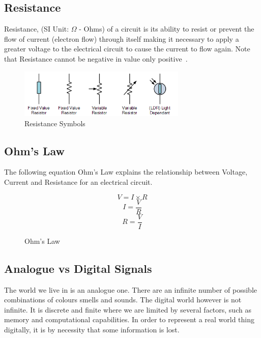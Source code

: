 \newpage
\subsection*{Resistance}
Resistance, (SI Unit: $\Omega$ - Ohms) of a circuit is its ability to resist or prevent the flow of current (electron flow) through itself making it necessary to apply a greater voltage to the electrical circuit to cause the current to flow again. Note that Resistance cannot be negative in value only positive~\citep{et-15}.

%
\begin{figure}[ht]
	\centering
	\includegraphics[width=8cm]{images/04}
	\caption{Resistance Symbols \citep{et-15}}
	\label{fig:resistance_symbols}
\end{figure}
%

\subsection*{Ohm's Law}
The following equation Ohm's Law explains the relationship between Voltage, Current and Resistance for an electrical circuit.

%
\begin{figure}[ht]
	\centering
	\begin{equation}
	V = I \times R
	\end{equation}
	\begin{equation}
	I = \frac{V}{R}
	\end{equation}
	\begin{equation}
	R = \frac{V}{I} 
	\end{equation}
	\caption{Ohm's Law}
	\label{fig:ohms_law_equation}
\end{figure}
%


\subsection*{Analogue vs Digital Signals}

The world we live in is an analogue one. There are an infinite number of possible combinations of colours smells and sounds. The digital world however is not infinite. It is discrete and finite where we are limited by several factors, such as memory and computational capabilities. In order to represent a real world thing digitally, it is by necessity that some information is lost.

